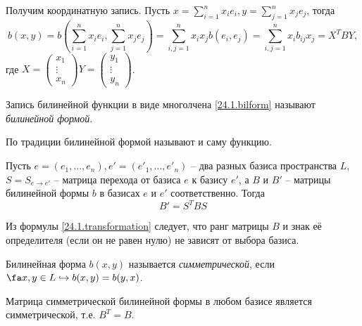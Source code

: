  Получим координатную запись. Пусть $x=\sum\limits_{i=1}^nx_ie_i,y=\sum\limits_{j=1}^nx_je_j$, тогда
  \begin{equation}\label{24.1.bilform}
  b(x,y)=b(\sum_{i=1}^nx_ie_i,\sum_{j=1}^nx_je_j)=\sum_{i,j=1}^nx_ix_jb(e_i,e_j)=\sum_{i,j=1}^nx_ib_{ij}x_j=X^TBY,
  \end{equation}
где $X=\begin{pmatrix}
x_1 \\ \vdots \\ x_n
\end{pmatrix} Y=\begin{pmatrix}
y_1 \\ \vdots \\ y_n
\end{pmatrix}$.
  \begin{defn}
  Запись билинейной функции в виде многолчена \ref{24.1.bilform} называют \textit{билинейной формой}.
  \begin{notion} По традиции билинейной формой называют и саму функцию.
  \end{notion}
  \end{defn}
  \begin{stt}
  Пусть $e=(e_1,...,e_n), e'=(e'_1,...,e'_n)$ -- два разных базиса пространства $L$, $S=S_{e\rightarrow e'}$ -- матрица перехода от базиса $e$ к базису $e'$, а $B$ и $B'$ -- матрицы билинейной формы $b$ в базисах $e$ и $e'$ соответственно. Тогда 
  \begin{equation}\label{24.1.transformation}
  B'=S^TBS
  \end{equation}
  
  \end{stt}
  Из формулы \ref{24.1.transformation} следует, что ранг матрицы $B$ и знак её определителя (если он не равен нулю) не зависят от выбора базиса.
  \begin{defn}
  Билинейная форма $b(x,y)$ называется \textit{симметрической}, если $\fa x,y \in L \hookrightarrow b(x,y)=b(y,x)$.
  \end{defn}
  \begin{stt}
  Матрица симметрической билинейной формы в любом базисе является симметрической, т.е. $B^T=B$.
  \end{stt}
  
